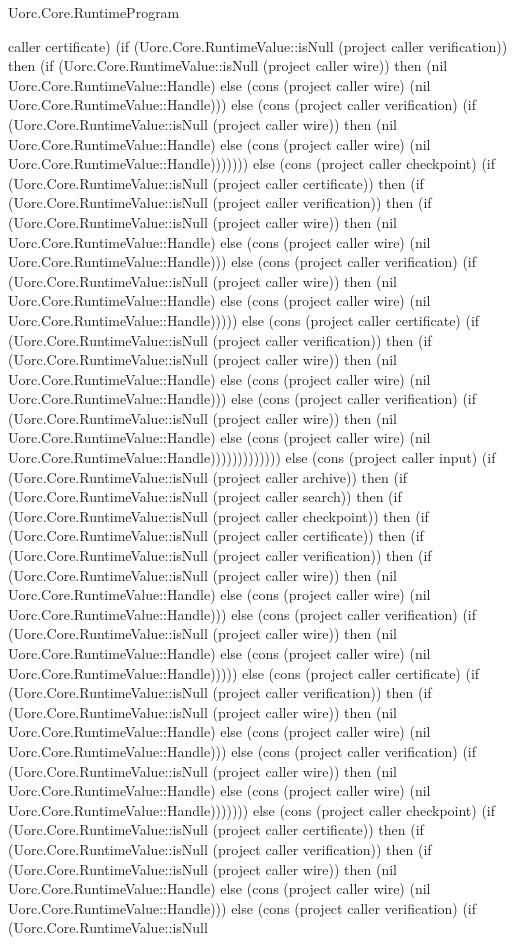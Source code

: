 \begin{lexlean}{Uorc.Core.RuntimeProgram}
\begin{semanticmodule}
{caller certificate) (if (Uorc.Core.RuntimeValue::isNull (project caller verification)) then (if (Uorc.Core.RuntimeValue::isNull (project caller wire)) then (nil Uorc.Core.RuntimeValue::Handle) else (cons (project caller wire) (nil Uorc.Core.RuntimeValue::Handle))) else (cons (project caller verification) (if (Uorc.Core.RuntimeValue::isNull (project caller wire)) then (nil Uorc.Core.RuntimeValue::Handle) else (cons (project caller wire) (nil Uorc.Core.RuntimeValue::Handle))))))) else (cons (project caller checkpoint) (if (Uorc.Core.RuntimeValue::isNull (project caller certificate)) then (if (Uorc.Core.RuntimeValue::isNull (project caller verification)) then (if (Uorc.Core.RuntimeValue::isNull (project caller wire)) then (nil Uorc.Core.RuntimeValue::Handle) else (cons (project caller wire) (nil Uorc.Core.RuntimeValue::Handle))) else (cons (project caller verification) (if (Uorc.Core.RuntimeValue::isNull (project caller wire)) then (nil Uorc.Core.RuntimeValue::Handle) else (cons (project caller wire) (nil Uorc.Core.RuntimeValue::Handle))))) else (cons (project caller certificate) (if (Uorc.Core.RuntimeValue::isNull (project caller verification)) then (if (Uorc.Core.RuntimeValue::isNull (project caller wire)) then (nil Uorc.Core.RuntimeValue::Handle) else (cons (project caller wire) (nil Uorc.Core.RuntimeValue::Handle))) else (cons (project caller verification) (if (Uorc.Core.RuntimeValue::isNull (project caller wire)) then (nil Uorc.Core.RuntimeValue::Handle) else (cons (project caller wire) (nil Uorc.Core.RuntimeValue::Handle))))))))))))) else (cons (project caller input) (if (Uorc.Core.RuntimeValue::isNull (project caller archive)) then (if (Uorc.Core.RuntimeValue::isNull (project caller search)) then (if (Uorc.Core.RuntimeValue::isNull (project caller checkpoint)) then (if (Uorc.Core.RuntimeValue::isNull (project caller certificate)) then (if (Uorc.Core.RuntimeValue::isNull (project caller verification)) then (if (Uorc.Core.RuntimeValue::isNull (project caller wire)) then (nil Uorc.Core.RuntimeValue::Handle) else (cons (project caller wire) (nil Uorc.Core.RuntimeValue::Handle))) else (cons (project caller verification) (if (Uorc.Core.RuntimeValue::isNull (project caller wire)) then (nil Uorc.Core.RuntimeValue::Handle) else (cons (project caller wire) (nil Uorc.Core.RuntimeValue::Handle))))) else (cons (project caller certificate) (if (Uorc.Core.RuntimeValue::isNull (project caller verification)) then (if (Uorc.Core.RuntimeValue::isNull (project caller wire)) then (nil Uorc.Core.RuntimeValue::Handle) else (cons (project caller wire) (nil Uorc.Core.RuntimeValue::Handle))) else (cons (project caller verification) (if (Uorc.Core.RuntimeValue::isNull (project caller wire)) then (nil Uorc.Core.RuntimeValue::Handle) else (cons (project caller wire) (nil Uorc.Core.RuntimeValue::Handle))))))) else (cons (project caller checkpoint) (if (Uorc.Core.RuntimeValue::isNull (project caller certificate)) then (if (Uorc.Core.RuntimeValue::isNull (project caller verification)) then (if (Uorc.Core.RuntimeValue::isNull (project caller wire)) then (nil Uorc.Core.RuntimeValue::Handle) else (cons (project caller wire) (nil Uorc.Core.RuntimeValue::Handle))) else (cons (project caller verification) (if (Uorc.Core.RuntimeValue::isNull }
\end{semanticmodule}
\end{lexlean}
